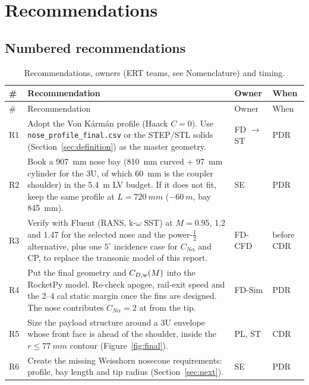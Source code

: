 \section{Recommendations}
\label{sec:recommendations}

\subsection{Numbered recommendations}

{\small
\begin{longtable}{@{}>{\raggedright\arraybackslash}p{0.8cm}>{\raggedright\arraybackslash}p{11.1cm}>{\raggedright\arraybackslash}p{2.2cm}>{\raggedright\arraybackslash}p{1.6cm}@{}}
\caption{Recommendations, owners (ERT teams, see Nomenclature) and timing.}
\label{tab:reco} \\
\toprule
\# & Recommendation & Owner & When \\
\midrule
\endfirsthead
\toprule
\# & Recommendation & Owner & When \\
\midrule
\endhead
R1 & Adopt the Von K\'arm\'an profile (Haack $C=0$). Use \texttt{nose\_profile\_final.csv} or the
STEP/STL solids (Section~\ref{sec:definition}) as the master geometry. & FD $\rightarrow$ ST & PDR \\
R2 & Book a \SI{907}{mm} nose bay (\SI{810}{mm} curved + \SI{97}{mm} cylinder for the 3U, of which
\SI{60}{mm} is the coupler shoulder) in the \SI{5.4}{m} LV budget. If it does not fit, keep the same
profile at $L = \SI{720}{mm}$ ($-\SI{60}{m}$, bay \SI{845}{mm}). & SE & PDR \\
R3 & Verify with Fluent (RANS, k-$\omega$ SST) at $M = 0.95$, 1.2 and 1.47 for the selected nose and
the power-$\tfrac12$ alternative, plus one $5^\circ$ incidence case for $C_{N\alpha}$ and CP, to
replace the transonic model of this report. & FD-CFD & before CDR \\
R4 & Put the final geometry and $C_{D,\rm w}(M)$ into the RocketPy model. Re-check apogee, rail-exit
speed and the 2--4 cal static margin once the fins are designed. The nose contributes
$C_{N\alpha} = 2$ at \FINXCP{} from the tip. & FD-Sim & PDR \\
R5 & Size the payload structure around a 3U envelope whose front face is \FINTHREEU{} ahead of the
shoulder, inside the $r \leq \SI{77}{mm}$ contour (Figure~\ref{fig:final}). & PL, ST & CDR \\
R6 & Create the missing Weisshorn nosecone requirements: profile, bay length and tip radius
(Section~\ref{sec:next}). & SE & PDR \\
\bottomrule
\end{longtable}
}


